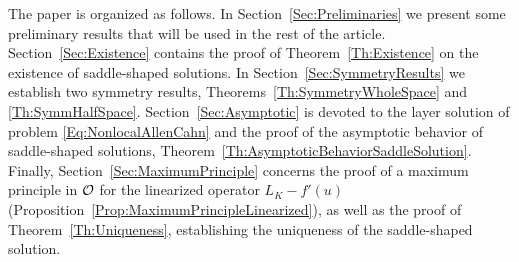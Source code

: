 The paper is organized as follows. In Section~\ref{Sec:Preliminaries} we present some preliminary results that will be used in the rest of the article. Section~\ref{Sec:Existence} contains the proof of Theorem~\ref{Th:Existence} on the existence of saddle-shaped solutions. In Section~\ref{Sec:SymmetryResults} we establish two symmetry results, Theorems~\ref{Th:SymmetryWholeSpace} and \ref{Th:SymmHalfSpace}. Section~\ref{Sec:Asymptotic} is devoted to the layer solution of problem \eqref{Eq:NonlocalAllenCahn} and the proof of the asymptotic behavior of saddle-shaped solutions, Theorem~\ref{Th:AsymptoticBehaviorSaddleSolution}. Finally, Section~\ref{Sec:MaximumPrinciple} concerns the proof of a maximum principle in $\mathcal{O}$ for the linearized operator $L_K - f'(u)$ (Proposition~\ref{Prop:MaximumPrincipleLinearized}), as well as the proof of Theorem~\ref{Th:Uniqueness}, establishing the uniqueness of the saddle-shaped solution.

